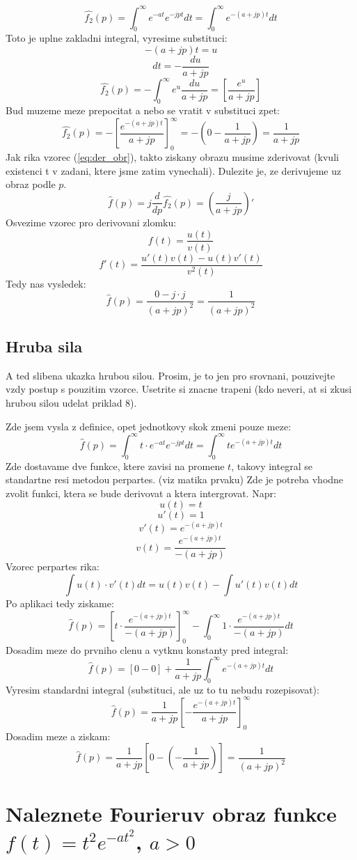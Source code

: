 $$\hat{f_2}(p)=\int_0^{\infty} e^{-at} e^{-jpt}dt = \int_0^{\infty} e^{-(a+jp)t}dt$$
Toto je uplne zakladni integral, vyresime substituci:
$$-(a+jp)t=u$$
$$dt = -\frac{du}{a+jp}$$
$$\hat{f_2}(p)=-\int_0^\infty e^u \frac{du}{a+jp} = \left[ \frac{e^u}{a+jp} \right]$$
Bud muzeme meze prepocitat a nebo se vratit v substituci zpet:
$$\hat{f_2}(p) =- \left[ \frac{e^{-(a+jp)t}}{a+jp} \right]_0^\infty = -(0 - \frac{1}{a+jp}) = \frac{1}{a+jp}$$
Jak rika vzorec (\ref{eq:der_obr}), takto ziskany obrazu musime zderivovat (kvuli existenci t v zadani, ktere jsme zatim vynechali). Dulezite je, ze derivujeme uz obraz podle $p$.
$$\hat{f}(p)=j\frac{d}{dp}\hat{f_2}(p)=\left(\frac{j}{a+jp} \right)'$$
Osvezime vzorec pro derivovani zlomku:
$$f(t) = \frac{u(t)}{v(t)}$$
$$f'(t) = \frac{u'(t)v(t) - u(t)v'(t)}{v^2(t)}$$
Tedy nas vysledek:
$$\hat{f}(p)=\frac{0-j\cdot j}{(a+jp)^2} = \frac{1}{(a+jp)^2}$$

\subsection{Hruba sila}

A ted slibena ukazka hrubou silou. Prosim, je to jen pro srovnani, pouzivejte vzdy postup s pouzitim vzorce. Usetrite si znacne trapeni (kdo neveri, at si zkusi hrubou silou udelat priklad 8).

Zde jsem vysla z definice, opet jednotkovy skok zmeni pouze meze:
$$\hat{f}(p)=\int_0^\infty t\cdot e^{-at} e^{-jpt}dt = \int_0^\infty t e^{-(a+jp)t}dt$$
Zde dostavame dve funkce, ktere zavisi na promene $t$, takovy integral se standartne resi metodou perpartes. (viz matika prvaku) Zde je potreba vhodne zvolit funkci, ktera se bude derivovat a ktera intergrovat. Napr:
$$u(t)=t$$
$$u'(t) = 1$$ 
$$v'(t) = e^{-(a+jp)t}$$
$$v(t) = \frac{e^{-(a+jp)t}}{-(a+jp)}$$
Vzorec perpartes rika:
$$\int u(t)\cdot v'(t)dt = u(t)v(t) - \int u'(t)v(t)dt$$
Po aplikaci tedy ziskame:
$$\hat{f}(p) = \left[t\cdot \frac{e^{-(a+jp)t}}{-(a+jp)} \right]_0^\infty - \int_0^\infty 1\cdot \frac{e^{-(a+jp)t}}{-(a+jp)} dt$$
Dosadim meze do prvniho clenu a vytknu konstanty pred integral:
$$\hat{f}(p)=[0-0]+\frac{1}{a+jp} \int_0^\infty e^{-(a+jp)t}dt$$
Vyresim standardni integral (substituci, ale uz to tu nebudu rozepisovat):
$$\hat{f}(p)= \frac{1}{a+jp} \left[ -\frac{ e^{-(a+jp)t}}{a+jp}\right]_0^\infty$$
Dosadim meze a ziskam:
$$\hat{f}(p) = \frac{1}{a+jp} \left[ 0 - \left(-\frac{1}{a+jp} \right) \right] = \frac{1}{(a+jp)^2}$$

\newpage

\section{Naleznete Fourieruv obraz funkce $f(t)=t^2 e^{-at^2}$, $a>0$}

